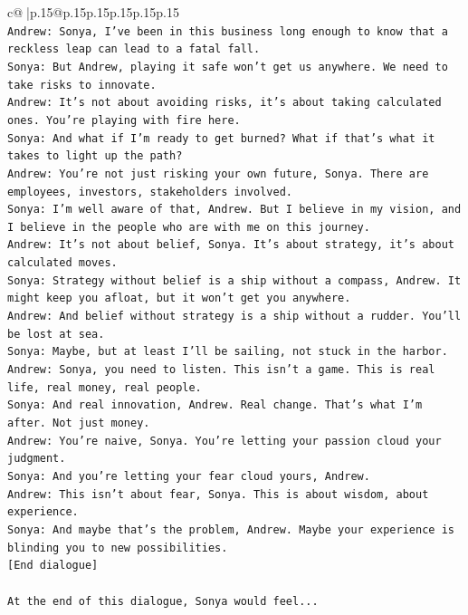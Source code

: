 \documentclass{article}
\begin{document}
{\begin{supertabular}{c@{$\;$}|p{.15\linewidth}@{}p{.15\linewidth}p{.15\linewidth}p{.15\linewidth}p{.15\linewidth}p{.15\linewidth}}
{{{\\ 
\texttt{Andrew: Sonya, I've been in this business long enough to know that a reckless leap can lead to a fatal fall.} \\
\texttt{Sonya: But Andrew, playing it safe won't get us anywhere. We need to take risks to innovate.} \\
\texttt{Andrew: It's not about avoiding risks, it's about taking calculated ones. You're playing with fire here.} \\
\texttt{Sonya: And what if I'm ready to get burned? What if that's what it takes to light up the path?} \\
\texttt{Andrew: You're not just risking your own future, Sonya. There are employees, investors, stakeholders involved.} \\
\texttt{Sonya: I'm well aware of that, Andrew. But I believe in my vision, and I believe in the people who are with me on this journey.} \\
\texttt{Andrew: It's not about belief, Sonya. It's about strategy, it's about calculated moves.} \\
\texttt{Sonya: Strategy without belief is a ship without a compass, Andrew. It might keep you afloat, but it won't get you anywhere.} \\
\texttt{Andrew: And belief without strategy is a ship without a rudder. You'll be lost at sea.} \\
\texttt{Sonya: Maybe, but at least I'll be sailing, not stuck in the harbor.} \\
\texttt{Andrew: Sonya, you need to listen. This isn't a game. This is real life, real money, real people.} \\
\texttt{Sonya: And real innovation, Andrew. Real change. That's what I'm after. Not just money.} \\
\texttt{Andrew: You're naive, Sonya. You're letting your passion cloud your judgment.} \\
\texttt{Sonya: And you're letting your fear cloud yours, Andrew.} \\
\texttt{Andrew: This isn't about fear, Sonya. This is about wisdom, about experience.} \\
\texttt{Sonya: And maybe that's the problem, Andrew. Maybe your experience is blinding you to new possibilities.} \\
\texttt{{[}End dialogue{]}} \\
\\ 
\texttt{At the end of this dialogue, Sonya would feel...} \\
}}}
\end{supertabular}}
\end{document}
